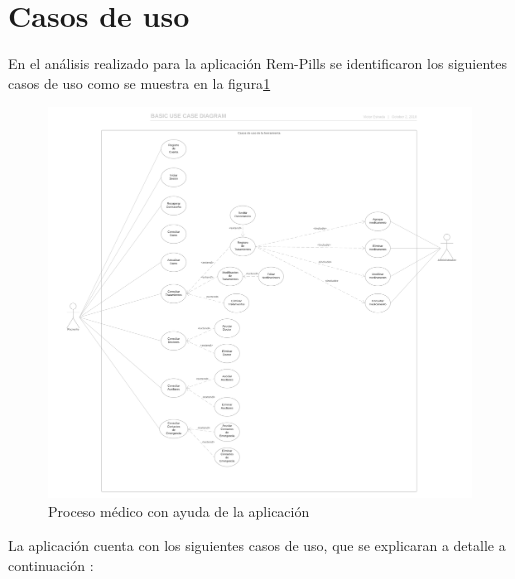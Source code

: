 \section{Casos de uso}
En el análisis realizado para la aplicación Rem-Pills se identificaron los siguientes casos de uso como se muestra en la figura\ref{fig:casosdeuso}
\begin{figure}[htb]
	\centering
	\includegraphics[width=1.1\textwidth]{images/cap2/casosdeuso}
	\caption{Proceso médico con ayuda de la aplicación} \label{fig:casosdeuso}
\end{figure} 
La aplicación cuenta con los siguientes casos de uso, que se explicaran a detalle a continuación :
